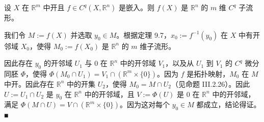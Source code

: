 \begin{proposition}

设 $ X $ 在 $ \mathbb{R}^{m} $ 中开且 $ f \in C^{q}(X, \mathbb{R}^{n}) $ 是嵌入。则 $ f(X) $ 是 $ \mathbb{R}^{n} $ 的 $ m $ 维 $ C^{q} $ 子流形。

\proofhead
我们令 $ M := f(X) $ 并选取 $ y_{0} \in M $。根据定理 9.7，$ x_{0} := f^{-1}(y_{0}) $ 在 $ X $ 中有开邻域 $ X_{0} $，使得 $ M_{0} := f(X_{0}) $ 是 $ \mathbb{R}^{n} $ 的 $ m $ 维子流形。

因此存在 $ y_{0} $ 的开邻域 $ U_{1} $ 与 0 在 $ \mathbb{R}^{n} $ 中的开邻域 $ V_{1} $，以及从 $ U_{1} $ 到 $ V_{1} $ 的 $ C^{q} $ 微分同胚 $ \Phi $，使得 $ \Phi(M_{0} \cap U_{1}) = V_{1} \cap (\mathbb{R}^{m} \times \{0\}) $。因为 $ f $ 是拓扑映射，$ M_{0} $ 在 $ M $ 中开。因此存在 $ \mathbb{R}^{n} $ 中的开集 $ U_{2} $，使得 $ M_{0} = M \cap U_{2} $（见命题 III.2.26）。因此 $ U := U_{1} \cap U_{2} $ 是 $ y_{0} $ 在 $ \mathbb{R}^{n} $ 中的开邻域，且 $ V := \Phi(U) $ 是 0 在 $ \mathbb{R}^{n} $ 中的开邻域，满足 $ \Phi(M \cap U) = V \cap (\mathbb{R}^{m} \times \{0\}) $。因为这对每个 $ y_{0} \in M $ 都成立，结论得证。 \nobreak\hspace{0.35em}■

\end{proposition}

